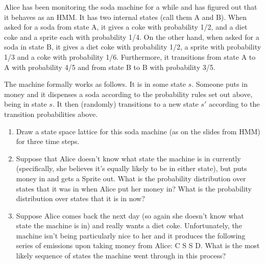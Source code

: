 \documentclass[fleqn]{hermans-hw}
\begin{document}
Alice has been monitoring the soda machine for a while and has figured
out that it behaves as an HMM.  It has two internal states (call them
A and B).  When asked for a soda from state A, it gives a coke with
probability 1/2, and a diet coke and a sprite each with probability
1/4.  On the other hand, when asked for a soda in state B, it gives a
diet coke with probability 1/2, a sprite with probability 1/3 and a
coke with probability 1/6.  Furthermore, it transitions from state A
to A with probability 4/5 and from state B to B with probability 3/5.

The machine formally works as follows.  It is in some state $s$.
Someone puts in money and it dispenses a soda according to the
probability rules set out above, being in state $s$.  It then
(randomly) transitions to a new state $s'$ according to the transition
probabilities above.

\begin{enumerate}
\item Draw a state space lattice for this soda machine (as on the slides from HMM) for three time steps.

\item Suppose that Alice doesn't know what state the machine is in
  currently (specifically, she believes it's equally likely to be in
  either state), but puts money in and gets a Sprite out.  What is the
  probability distribution over states that it was in when Alice put
  her money in?  What is the probability distribution over states that
  it is in now?

\item Suppose Alice comes back the next day (so again she doesn't know
  what state the machine is in) and really wants a diet coke.
  Unfortunately, the machine isn't being particularly nice to her and
  it produces the following series of emissions upon taking money from
  Alice: C S S D.  What is the most likely sequence of states the
  machine went through in this process?
\end{enumerate}
\end{document}
